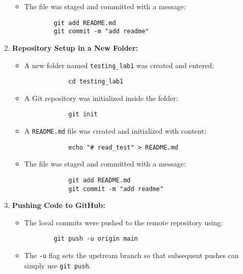 \documentclass[12pt, a4paper]{report}
\begin{document}
\begin{enumerate}
\begin{itemize}
        \item The file was staged and committed with a message:
        \begin{verbatim}
        git add README.md
        git commit -m "add readme"
        \end{verbatim}
    \end{itemize}

    \item \textbf{Repository Setup in a New Folder:}
        \begin{itemize}
            \item A new folder named \texttt{testing\_lab1} was created and entered:
            \begin{verbatim}
            cd testing_lab1
            \end{verbatim}

            \item A Git repository was initialized inside the folder:
            \begin{verbatim}
            git init
            \end{verbatim}

            \item A \texttt{README.md} file was created and initialized with content:
            \begin{verbatim}
            echo "# read_test" > README.md
            \end{verbatim}

            \item The file was staged and committed with a message:
            \begin{verbatim}
            git add README.md
            git commit -m "add readme"
            \end{verbatim}
        \end{itemize}


    \item \textbf{Pushing Code to GitHub:}
    \begin{itemize}
        \item The local commits were pushed to the remote repository using:
        \begin{verbatim}
        git push -u origin main
        \end{verbatim}
        \item The \texttt{-u} flag sets the upstream branch so that subsequent pushes can simply use \texttt{git push}.
    \end{itemize}


\end{enumerate}
\end{document}
